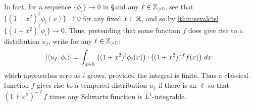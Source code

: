   In fact, for a sequence $\{\phi_i\}\rightarrow 0$ in \S and any $\ell\in\mathbb{Z}_{>0}$, see that $\{(1+x^2)^\ell\phi_i(x)\}\rightarrow 0$ for any fixed $x\in\mathbb{R}$, and so by \cref{thm:sevalcts} $\{(1+x^2)^\ell\phi_i\}\rightarrow 0$.
  Thus, pretending that some function $f$ does give rise to a distribution $u_f$, write for any $\ell\in\mathbb{Z}_{>0}$:
  \begin{align*}
    |\langle u_f,\phi_i\rangle| 
    = \int_{x\in\mathbb{R}} \left( (1+x^2)^\ell\phi_i(x) \right) \cdot \left( (1+x^2)^{-\ell} f(x) \right) \,dx
  \end{align*}
  which approaches zero as $i$ grows, provided the integral is finite.
  Thus a classical function $f$ gives rise to a tempered distribution $u_f$ if there is an $\ell$ so that $(1+x^2)^{-\ell}f$ times any Schwartz function is $L^1$-integrable.

